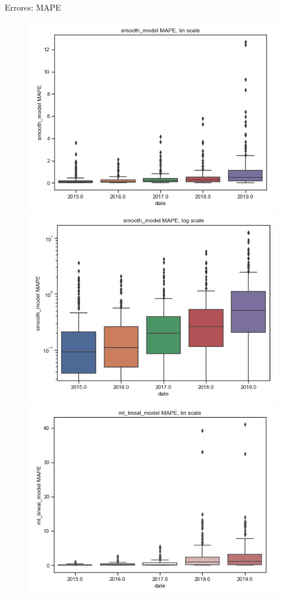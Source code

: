 \documentclass[10pt]{beamer}
\begin{document}
\begin{frame}{Errores: MAPE}
\begin{figure}
\includegraphics[scale=0.25]{img/16.png}
\includegraphics[scale=0.25]{img/17.png}
\includegraphics[scale=0.25]{img/18.png}

\end{figure}
\end{frame}
\end{document}
